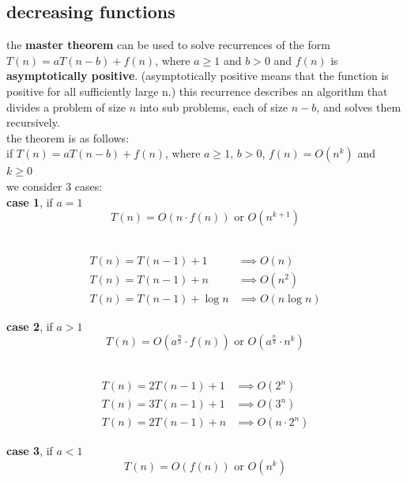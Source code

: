 \documentclass[a4paper,12pt]{article}
\begin{document}
\subsection{decreasing functions}
\label{sec:org8181804}
the \textbf{master theorem} can be used to solve recurrences of the form \(T(n) = aT(n - b) + f(n)\), where \(a \geq 1\) and \(b > 0\) and \(f(n)\) is \textbf{asymptotically positive}. (asymptotically positive means that the function is positive for all sufficiently large n.) this recurrence describes an algorithm that divides a problem of size \(n\) into sub problems, each of size \(n-b\), and solves them recursively.\\
the theorem is as follows:\\
if \(T(n) = aT(n-b) + f(n)\), where \(a \geq 1\), \(b > 0\), \(f(n) = O\left(n^k\right)\) and \(k \geq 0\)\\
we consider 3 cases:\\
\textbf{case 1}, if \(a = 1\)\\
\[ T(n) = O(n \cdot f(n)) \text{ or } O\left(n^{k+1}\right) \]\\
\begin{my_example}
\begin{align}
  T(n) = T(n - 1) + 1 &\implies O(n)\\
  T(n) = T(n - 1) + n &\implies O(n^2)\\
  T(n) = T(n-1) + \log{n} &\implies O(n\log{n})
\end{align}
\end{my_example}
\textbf{case 2}, if \(a > 1\)\\
\[ T(n) = O\left(a^{\frac{n}{b}} \cdot f(n)\right) \text{ or } O\left(a^{\frac{n}{b}} \cdot n^k\right) \]\\
\begin{my_example}
\begin{align}
  T(n) = 2T(n-1)+1 &\implies O(2^n)\\
  T(n) = 3T(n-1)+1 &\implies O(3^n)\\
  T(n) = 2T(n-1)+n &\implies O(n \cdot 2^n)
\end{align}
\end{my_example}
\textbf{case 3}, if \(a < 1\)\\
\[ T(n) = O(f(n)) \text{ or } O\left(n^k\right) \]
\end{document}
